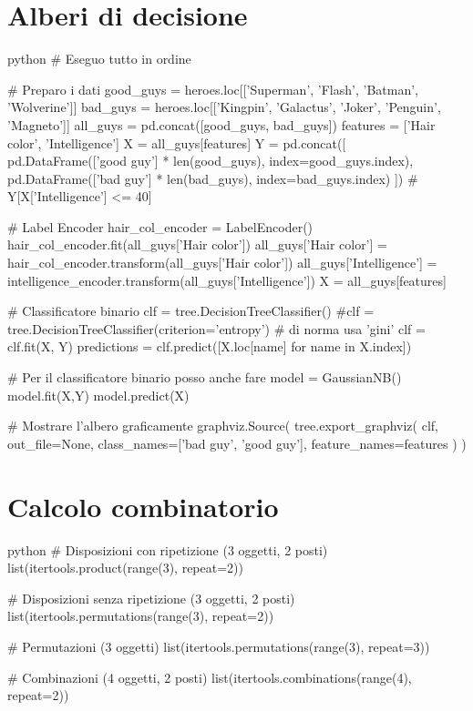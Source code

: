 \documentclass[11pt]{report}
\begin{document}
\section{Alberi di decisione}
\begin{mintedbox}{python}
# Eseguo tutto in ordine

# Preparo i dati
good_guys = heroes.loc[['Superman', 'Flash', 'Batman', 'Wolverine']]
bad_guys = heroes.loc[['Kingpin', 'Galactus', 'Joker', 'Penguin', 'Magneto']]
all_guys = pd.concat([good_guys, bad_guys])
features = ['Hair color', 'Intelligence']
X = all_guys[features]
Y = pd.concat([
    pd.DataFrame(['good guy'] * len(good_guys), index=good_guys.index),
    pd.DataFrame(['bad guy'] * len(bad_guys), index=bad_guys.index)
])
# Y[X['Intelligence'] <= 40]

# Label Encoder
hair_col_encoder = LabelEncoder()
hair_col_encoder.fit(all_guys['Hair color'])
all_guys['Hair color'] = hair_col_encoder.transform(all_guys['Hair color'])
all_guys['Intelligence'] = intelligence_encoder.transform(all_guys['Intelligence'])
X = all_guys[features]

# Classificatore binario
clf = tree.DecisionTreeClassifier()
#clf = tree.DecisionTreeClassifier(criterion='entropy')     # di norma usa 'gini'
clf = clf.fit(X, Y)
predictions = clf.predict([X.loc[name] for name in X.index])

# Per il classificatore binario posso anche fare
model = GaussianNB()
model.fit(X,Y)
model.predict(X)

# Mostrare l'albero graficamente
graphviz.Source(
    tree.export_graphviz(
        clf,
        out_file=None,
        class_names=['bad guy', 'good guy'],
        feature_names=features
    )
)
\end{mintedbox}

\section{Calcolo combinatorio}
\begin{mintedbox}{python}
# Disposizioni con ripetizione (3 oggetti, 2 posti)
list(itertools.product(range(3), repeat=2))

# Disposizioni senza ripetizione (3 oggetti, 2 posti)
list(itertools.permutations(range(3), repeat=2))

# Permutazioni (3 oggetti)
list(itertools.permutations(range(3), repeat=3))

# Combinazioni (4 oggetti, 2 posti)
list(itertools.combinations(range(4), repeat=2))
\end{mintedbox}
\end{document}

